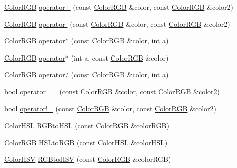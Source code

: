 \begin{DoxyCompactItemize}
\hyperlink{structQuickCG_1_1ColorRGB}{Color\-R\-G\-B} \hyperlink{namespaceQuickCG_a910a9f0a870972575c3627e141e01a68}{operator+} (const \hyperlink{structQuickCG_1_1ColorRGB}{Color\-R\-G\-B} \&color, const \hyperlink{structQuickCG_1_1ColorRGB}{Color\-R\-G\-B} \&color2)
\item 
\hyperlink{structQuickCG_1_1ColorRGB}{Color\-R\-G\-B} \hyperlink{namespaceQuickCG_ab46d60da5dd5ec38e88a2676cc5a2825}{operator-\/} (const \hyperlink{structQuickCG_1_1ColorRGB}{Color\-R\-G\-B} \&color, const \hyperlink{structQuickCG_1_1ColorRGB}{Color\-R\-G\-B} \&color2)
\item 
\hyperlink{structQuickCG_1_1ColorRGB}{Color\-R\-G\-B} \hyperlink{namespaceQuickCG_a5ae0f52520fe1606bb9c9de7adb321ed}{operator$\ast$} (const \hyperlink{structQuickCG_1_1ColorRGB}{Color\-R\-G\-B} \&color, int a)
\item 
\hyperlink{structQuickCG_1_1ColorRGB}{Color\-R\-G\-B} \hyperlink{namespaceQuickCG_a46f3904adc4c12e4e4586784e03c35cc}{operator$\ast$} (int a, const \hyperlink{structQuickCG_1_1ColorRGB}{Color\-R\-G\-B} \&color)
\item 
\hyperlink{structQuickCG_1_1ColorRGB}{Color\-R\-G\-B} \hyperlink{namespaceQuickCG_af6948c5888f2777b73f5e9af0adb0000}{operator/} (const \hyperlink{structQuickCG_1_1ColorRGB}{Color\-R\-G\-B} \&color, int a)
\item 
bool \hyperlink{namespaceQuickCG_a4d855b23bc84fe6621a224404843738d}{operator==} (const \hyperlink{structQuickCG_1_1ColorRGB}{Color\-R\-G\-B} \&color, const \hyperlink{structQuickCG_1_1ColorRGB}{Color\-R\-G\-B} \&color2)
\item 
bool \hyperlink{namespaceQuickCG_acda02e6695432056866eef615f73ee75}{operator!=} (const \hyperlink{structQuickCG_1_1ColorRGB}{Color\-R\-G\-B} \&color, const \hyperlink{structQuickCG_1_1ColorRGB}{Color\-R\-G\-B} \&color2)
\item 
\hyperlink{structQuickCG_1_1ColorHSL}{Color\-H\-S\-L} \hyperlink{namespaceQuickCG_a7f5e5aa8098d7678eef30a2c611b2059}{R\-G\-Bto\-H\-S\-L} (const \hyperlink{structQuickCG_1_1ColorRGB}{Color\-R\-G\-B} \&color\-R\-G\-B)
\item 
\hyperlink{structQuickCG_1_1ColorRGB}{Color\-R\-G\-B} \hyperlink{namespaceQuickCG_a0630eff24e04496bad465837297f6881}{H\-S\-Lto\-R\-G\-B} (const \hyperlink{structQuickCG_1_1ColorHSL}{Color\-H\-S\-L} \&color\-H\-S\-L)
\item 
\hyperlink{structQuickCG_1_1ColorHSV}{Color\-H\-S\-V} \hyperlink{namespaceQuickCG_a8c175a9cd1517065dffdf5e8def8ca5e}{R\-G\-Bto\-H\-S\-V} (const \hyperlink{structQuickCG_1_1ColorRGB}{Color\-R\-G\-B} \&color\-R\-G\-B)

\end{DoxyCompactItemize}
